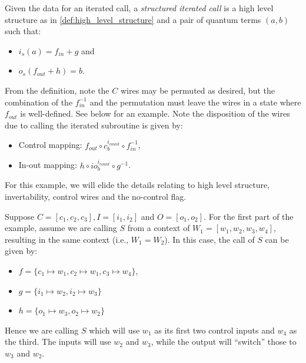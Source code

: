 \begin{definition}\label{def:structured_iterated_call}
  Given the data for an iterated call, a \emph{structured iterated call} is a high level structure
  as in \vref{def:high_level_structure} and a pair of quantum terms $(a,b)$ such that:
  \begin{itemize}
    \item $i_s(a) = f_{in}+g$ and
    \item $o_s(f_{out}+h) = b$.
  \end{itemize}

\end{definition}

From the definition, note the $C$ wires may be permuted as desired, but the combination of the
$f_{in}^{-1}$ and the permutation must leave the wires in a state where $f_{out}$ is well-defined.
See below for an example. Note the disposition of the wires due to calling the iterated subroutine
is given by:
\begin{itemize}
  \item Control mapping: $f_{out} \circ c_b^{i_{count}}\circ f_{in}^{-1}$,
  \item In-out mapping: $h \circ io_b^{i_{count}} \circ g^{-1}$.
\end{itemize}


\begin{example}
\end{example}
  For this example, we will elide the details relating to high level structure, invertability,
  control wires and the no-control flag.

  Suppose $C=[c_1,c_2,c_3], I=[i_1,i_2]$ and $O=[o_1,o_2]$. For the first part of the example,
  assume we are calling $S$ from a context of $W_1=[w_1,w_2,w_3,w_4]$, resulting in the same
  context (i.e., $W_1 = W_2$). In this case, the call of $S$ can be given by:
  \begin{itemize}
    \item $f = \{c_1\mapsto w_1, c_2 \mapsto w_1, c_3 \mapsto w_4\}$,
    \item $g = \{i_1 \mapsto w_2, i_2 \mapsto w_3\}$
    \item $h = \{o_1 \mapsto w_3, o_2 \mapsto w_2\}$
  \end{itemize}
  Hence we are calling $S$ which will use $w_1$ as its first two control inputs and $w_4$ as the
  third. The inputs will use $w_2$ and $w_3$, while the output will ``switch'' those to $w_3$ and
  $w_2$.

